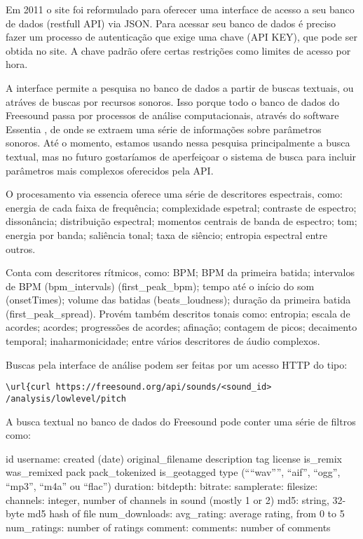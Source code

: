 Em 2011 o site foi reformulado para oferecer uma interface de acesso a seu banco de dados (restfull API) \cite{Akkermans2011} via JSON. Para acessar seu banco de dados é preciso fazer um processo de autenticação que exige uma chave (API KEY), que pode ser obtida no site. A chave padrão ofere certas restrições como limites de acesso por hora. 

A interface permite a pesquisa no banco de dados a partir de buscas textuais, ou atráves de buscas por recursos sonoros. Isso porque todo o banco de dados do Freesound passa por processos de análise computacionais, através do software Essentia \cite{Bogdanov2013}, de onde se extraem uma série de informações sobre parâmetros sonoros. Até o momento, estamos usando nessa pesquisa principalmente a busca textual, mas no futuro gostaríamos de aperfeiçoar o sistema de busca para incluir parâmetros mais complexos oferecidos pela API.

O procesamento via essencia oferece uma série de descritores espectrais, como: energia de cada faixa de frequência; complexidade espetral; contraste de espectro; dissonância; distribuição espectral; momentos centrais de banda de espectro; tom; energia por banda; saliência tonal; taxa de siêncio; entropia espectral entre outros.

Conta com descritores rítmicos, como: BPM; BPM da primeira batida; intervalos de BPM (bpm\_intervals) (first\_peak\_bpm); tempo até o início do som (onsetTimes); volume das batidas (beats\_loudness); duração da primeira batida (first\_peak\_spread). Provém também descritos tonais como: entropia; escala de acordes; acordes; progressões de acordes; afinação; contagem de picos; decaimento temporal; inaharmonicidade; entre vários descritores de áudio complexos.

Buscas pela interface de análise podem ser feitas por um acesso HTTP do tipo:

\begin{verbatim}
\url{curl https://freesound.org/api/sounds/<sound_id>
/analysis/lowlevel/pitch
\end{verbatim}

A busca textual no banco de dados do Freesound pode conter uma série de filtros como:

id  
username:   
created (date)
original\_filename
description
tag
license
is\_remix
was\_remixed
pack
pack\_tokenized
is\_geotagged
type (“``wav”'', ``aif'', ``ogg'', ``mp3'', ``m4a'' ou ``flac'')
duration:   
bitdepth:   
bitrate:    
samplerate: 
filesize:   
channels:   integer, number of channels in sound (mostly 1 or 2)
md5:    string, 32-byte md5 hash of file
num\_downloads: 
avg\_rating:     average rating, from 0 to 5
num\_ratings: number of ratings
comment:    
comments:   number of comments

